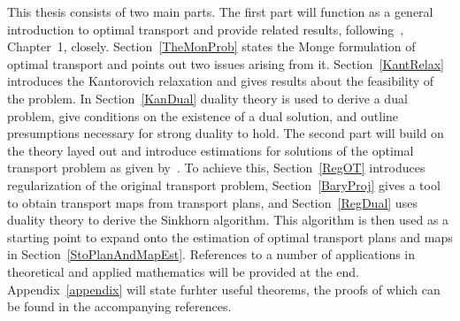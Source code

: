This thesis consists of two main parts. The first part will function as a general introduction to optimal transport and provide related results, following\ \cite{San2015}, Chapter~1, closely. Section~\ref{TheMonProb} states the Monge formulation of optimal transport and points out two issues arising from it. Section~\ref{KantRelax} introduces the Kantorovich relaxation and gives results about the feasibility of the problem. In Section~\ref{KanDual} duality theory is used to derive a dual problem, give conditions on the existence of a dual solution, and outline presumptions necessary for strong duality to hold. The second part will build on the theory layed out and introduce estimations for solutions of the optimal transport problem as given by\ \cite{Seg2018}. To achieve this, Section~\ref{RegOT} introduces regularization of the original transport problem, Section~\ref{BaryProj} gives a tool to obtain transport maps from transport plans, and Section~\ref{RegDual} uses duality theory to derive the Sinkhorn algorithm. This algorithm is then used as a starting point to expand onto the estimation of optimal transport plans and maps in Section~\ref{StoPlanAndMapEst}. References to a number of applications in theoretical and applied mathematics will be provided at the end. Appendix~\ref{appendix} will state furhter useful theorems, the proofs of which can be found in the accompanying references.